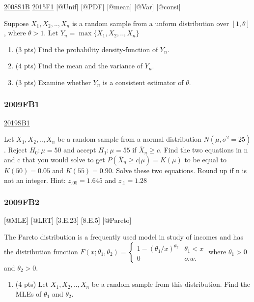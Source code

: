 \documentclass[6pt,Portrait]{article}
\providecommand{\tightlist}{%
  \setlength{\itemsep}{0pt}\setlength{\parskip}{0pt}}
\begin{document}
\protect\hyperlink{s1b}{2008S1B} \protect\hyperlink{f1-5}{2015F1}
{[}@Unif{]} {[}@PDF{]} {[}@mean{]} {[}@Var{]} {[}@consi{]}

Suppose \(X_1,X_2,..,X_{n}\) is a random sample from a unform
distribution over \([1,\theta]\), where \(\theta>1\). Let
\(Y_{n}=\max\{X_1,X_2,..,X_{n}\}\)

\begin{enumerate}
\def\labelenumi{(\alph{enumi})}
\item
  (3 pts) Find the probability density-function of \(Y_{n}\).
\item
  (4 pts) Find the mean and the variance of \(Y_{n}\).
\item
  (3 pts) Examine whether \(Y_{n}\) is a consistent estimator of
  \(\theta\).
\end{enumerate}

\hypertarget{fb1}{%
\subsubsection{2009FB1}\label{fb1}}

\protect\hyperlink{sb1-3}{2019SB1}

Let \(X_1,X_2,..,X_n\) be a random sample from a normal distribution
\(N(\mu,\sigma^2=25)\). Reject \(H_0:\mu=50\) and accept \(H_1:\mu=55\)
if \(\bar X_n\ge c\). Find the two equations in n and c that you would
solve to get \(P(\bar X_n\ge c|\mu)=K(\mu)\) to be equal to
\(K(50)=0.05\) and \(K(55)=0.90\). Solve these two equations. Round up
if n is not an integer. Hint: \(z_{.05}=1.645\) and \(z_{.1}=1.28\)

\hypertarget{fb2}{%
\subsubsection{2009FB2}\label{fb2}}

{[}@MLE{]} {[}@LRT{]} {[}3.E.23{]} {[}8.E.5{]} {[}@Pareto{]}

The Pareto distribution is a frequently used model in study of incomes
and has the distribution function
\(F(x;\theta_1,\theta_2)=\begin{cases}1-(\theta_1/x)^{\theta_2}& \theta_1<x\\0& o.w.\end{cases}\)
where \(\theta_1>0\) and \(\theta_2>0\).

\begin{enumerate}
\def\labelenumi{(\alph{enumi})}
\tightlist
\item
  (4 pts) Let \(X_1,X_2,..,X_n\) be a random sample from this
  distribution. Find the MLEs of \(\theta_1\) and \(\theta_2\).
\end{enumerate}
\end{document}

